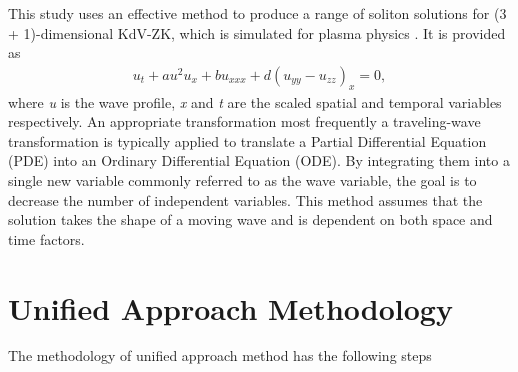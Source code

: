 \documentclass{article}
\numberwithin{equation}{section}
\begin{document}
This study uses an effective method to produce a range of soliton solutions for (3 + 1)-dimensional KdV-ZK, which is simulated for plasma physics \cite{b42,b43}. It is provided as
\begin{eqnarray}\label{KDVZK}
u_{t}+a u^2 u_{x}+b u_{xxx}+d(u_{yy}-u_{zz})_{x}=0,
\end{eqnarray}
where \emph{u} is the wave profile, \emph{x} and \emph{t} are the scaled spatial and temporal variables respectively. An appropriate transformation most frequently a traveling-wave transformation is typically applied to translate a Partial Differential Equation (PDE) into an Ordinary Differential Equation (ODE). By integrating them into a single new variable commonly referred to as the wave variable, the goal is to decrease the number of independent variables. This method assumes that the solution takes the shape of a moving wave and is dependent on both space and time factors.
\section{Unified Approach Methodology }
The methodology of unified approach method has the following steps
\end{document}
